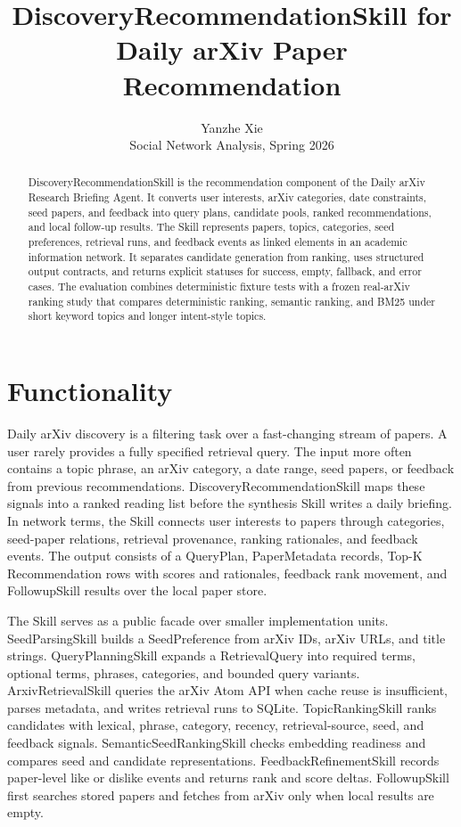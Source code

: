 \documentclass{article}
\title{DiscoveryRecommendationSkill for Daily arXiv Paper Recommendation}
\author{%
  Yanzhe Xie \\
  Social Network Analysis, Spring 2026
}
\begin{document}
\maketitle

\begin{abstract}
DiscoveryRecommendationSkill is the recommendation component of the Daily arXiv Research Briefing Agent. It converts user interests, arXiv categories, date constraints, seed papers, and feedback into query plans, candidate pools, ranked recommendations, and local follow-up results. The Skill represents papers, topics, categories, seed preferences, retrieval runs, and feedback events as linked elements in an academic information network. It separates candidate generation from ranking, uses structured output contracts, and returns explicit statuses for success, empty, fallback, and error cases. The evaluation combines deterministic fixture tests with a frozen real-arXiv ranking study that compares deterministic ranking, semantic ranking, and BM25 under short keyword topics and longer intent-style topics.
\end{abstract}

\section{Functionality}

Daily arXiv discovery is a filtering task over a fast-changing stream of papers. A user rarely provides a fully specified retrieval query. The input more often contains a topic phrase, an arXiv category, a date range, seed papers, or feedback from previous recommendations. DiscoveryRecommendationSkill maps these signals into a ranked reading list before the synthesis Skill writes a daily briefing. In network terms, the Skill connects user interests to papers through categories, seed-paper relations, retrieval provenance, ranking rationales, and feedback events. The output consists of a QueryPlan, PaperMetadata records, Top-K Recommendation rows with scores and rationales, feedback rank movement, and FollowupSkill results over the local paper store.

The Skill serves as a public facade over smaller implementation units. SeedParsingSkill builds a SeedPreference from arXiv IDs, arXiv URLs, and title strings. QueryPlanningSkill expands a RetrievalQuery into required terms, optional terms, phrases, categories, and bounded query variants. ArxivRetrievalSkill queries the arXiv Atom API when cache reuse is insufficient, parses metadata, and writes retrieval runs to SQLite. TopicRankingSkill ranks candidates with lexical, phrase, category, recency, retrieval-source, seed, and feedback signals. SemanticSeedRankingSkill checks embedding readiness and compares seed and candidate representations. FeedbackRefinementSkill records paper-level like or dislike events and returns rank and score deltas. FollowupSkill first searches stored papers and fetches from arXiv only when local results are empty.
\end{document}
